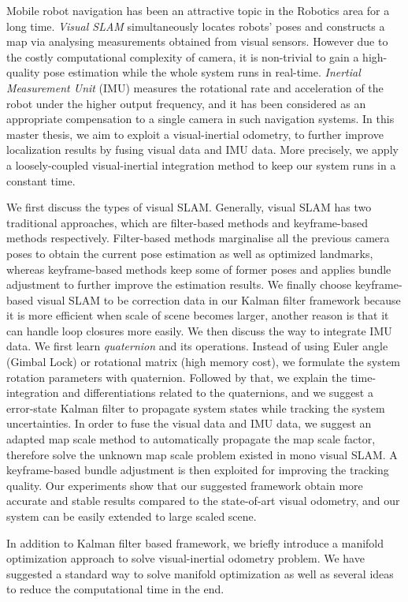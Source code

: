 
Mobile robot navigation has been an attractive topic in the Robotics area for a long time. \textit{Visual SLAM} simultaneously locates robots' poses and constructs a map via analysing measurements obtained from visual sensors. However due to the costly computational complexity of camera, it is non-trivial to gain a high-quality pose estimation while the whole system runs in real-time. \textit{Inertial Measurement Unit} (IMU) measures the rotational rate and acceleration of the robot under the higher output frequency, and it has been considered as an appropriate compensation to a single camera in such navigation systems. In this master thesis, we aim to exploit a visual-inertial odometry, to further improve localization results by fusing visual data and IMU data. More precisely, we apply a loosely-coupled visual-inertial integration method to keep our system runs in a constant time. 

We first discuss the types of visual SLAM. Generally, visual SLAM has two traditional approaches, which are filter-based methods and keyframe-based methods respectively. Filter-based methods marginalise all the previous camera poses to obtain the current pose estimation as well as optimized landmarks, whereas keyframe-based methods keep some of former poses and applies bundle adjustment to further improve the estimation results. We finally choose keyframe-based visual SLAM to be correction data in our Kalman filter framework because it is more efficient when scale of scene becomes larger, another reason is that it can handle loop closures more easily. We then discuss the way to integrate IMU data. We first learn \textit{quaternion} and its operations. Instead of using Euler angle (Gimbal Lock) or rotational matrix (high memory cost), we formulate the system rotation parameters with quaternion. Followed by that, we explain the time-integration and differentiations related to the quaternions, and we suggest a error-state Kalman filter to propagate system states while tracking the system uncertainties. In order to fuse the visual data and IMU data, we suggest an adapted map scale method to automatically propagate the map scale factor, therefore solve the unknown map scale problem existed in mono visual SLAM. A keyframe-based bundle adjustment is then exploited for improving the tracking quality. Our experiments show that our suggested framework obtain more accurate and stable results compared to the state-of-art visual odometry, and our system can be easily extended to large scaled scene.

In addition to Kalman filter based framework, we briefly introduce a manifold optimization approach to solve visual-inertial odometry problem. We have suggested a standard way to solve manifold optimization as well as several ideas to reduce the computational time in the end.

